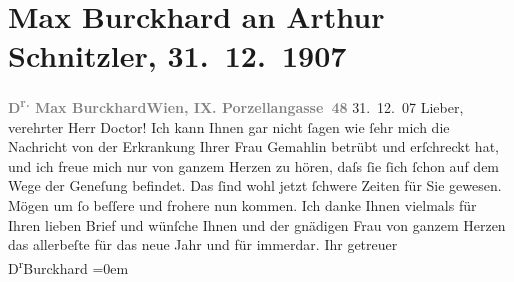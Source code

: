 

               \section[Max Burckhard an Arthur Schnitzler, 31. 12. 1907]{ Max Burckhard an Arthur Schnitzler, 31. 12. 1907}\nopagebreak{}\rehead{ }\begin{ledgroupsized}[t]{13cm}\normalsize\beginnumbering{} \toendnotes[C]{\smallbreak\pagebreak[2]} 
\toendnotes[C]{\smallbreak}\pstart
           \noindent{}{\pb}\textcolor{gray}{\textbf{D\textsuperscript{r.} Max Burckhard}}\hfill \textcolor{gray}{\textbf{Wien, IX. Porzellangasse 48}}{ }31. 12. 07\pend
           \pstart
           \raggedleft{}\textcolor{gray}{\textbf{}}\hspace*{3.5em}\pend
           \pstart{}Lieber, verehrter Herr Doctor!\pend\pstart
           Ich kann Ihnen gar nicht ſagen wie ſehr mich die Nachricht von der Erkrankung
                    Ihrer Frau Gemahlin betrübt
                    und erſchreckt hat, und ich freue mich nur von ganzem Herzen zu hören, daſs ſie
                    ſich ſchon auf dem Wege der Geneſung befindet. Das ſind wohl jetzt ſchwere
                    Zeiten {\pb}für Sie gewesen. Mögen um ſo
                    beſſere und frohere nun kommen.\pend
           \pstart
           Ich danke Ihnen vielmals für Ihren lieben Brief und wünſche Ihnen und der
                    gnädigen Frau von ganzem
                    Herzen das allerbeſte für das neue Jahr und für immerdar.\pend
           \pstart
           Ihr getreuer{\\[\baselineskip]}\spacefill\mbox{D\textsuperscript{r}Burckhard}\pend
           \leftskip=0em{}          \endnumbering{}\end{ledgroupsized}  \newcommand{\dateiname}{L01747}\newcommand{\titel}{Max Burckhard an Arthur Schnitzler, 31. 12. 1907}\newcommand{\editorInnen}{Martin Anton Müller und Gerd-Hermann Susen}
      